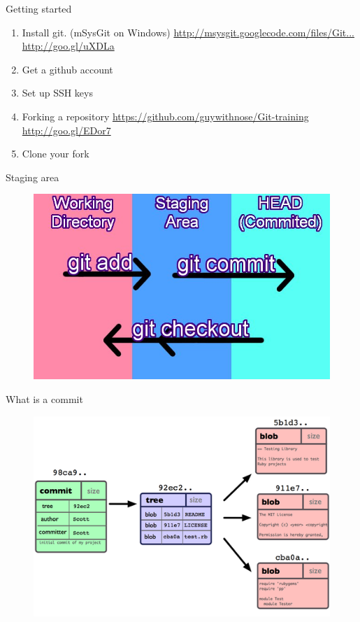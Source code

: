 \documentclass[14pt]{beamer}
\begin{document}
\begin{frame}{Getting started}
	\begin{enumerate}
		\small
		\item Install git. (mSysGit on Windows)\newline
		\href{http://msysgit.googlecode.com/files/Git-1.7.11-preview20120710.exe}{http://msysgit.googlecode.com/files/Git...}
		\href{http://goo.gl/uXDLa}{http://goo.gl/uXDLa}
		\item Get a github account
		\item Set up SSH keys
		\item Forking a repository\newline
		\href{https://github.com/guywithnose/Git-training}{https://github.com/guywithnose/Git-training}
		\href{http://goo.gl/EDor7}{http://goo.gl/EDor7}
		\item Clone your fork
	\end{enumerate}
\end{frame}

\begin{frame}{Staging area}
	\begin{figure}[htb]
		\centering
		\includegraphics[width=\textwidth]{commit-add-reset.jpg}
	\end{figure}
\end{frame}

\begin{frame}{What is a commit}
	\begin{figure}[htb]
		\centering
		\includegraphics[width=\textwidth]{commitBlobs.png}
	\end{figure}
\end{frame}
\end{document}
